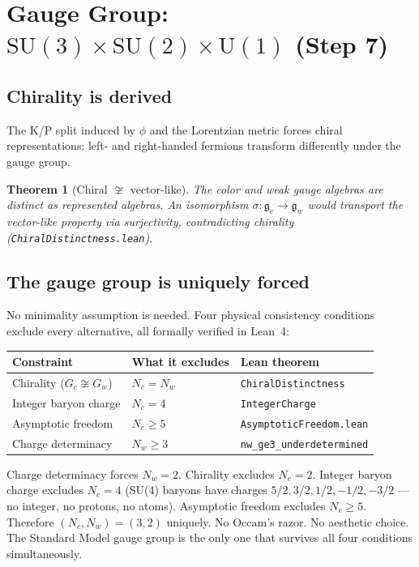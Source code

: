 \documentclass[11pt,letterpaper]{article}
\newtheorem{theorem}{Theorem}
\begin{document}
\section{Gauge Group: $\mathrm{SU}(3) \times \mathrm{SU}(2)
  \times \mathrm{U}(1)$ (Step 7)}

\subsection{Chirality is derived}

The K/P split induced by $\phi$ and the Lorentzian metric forces
chiral representations: left- and right-handed fermions transform
differently under the gauge group.

\begin{theorem}[Chiral $\not\cong$ vector-like]
\label{thm:distinct}
The color and weak gauge algebras are distinct as represented algebras.
An isomorphism $\sigma: \mathfrak{g}_c \to \mathfrak{g}_w$ would
transport the vector-like property via surjectivity, contradicting
chirality (\texttt{ChiralDistinctness.lean}).
\end{theorem}

\subsection{The gauge group is uniquely forced}
\label{sec:minimality}

No minimality assumption is needed.  Four physical consistency
conditions exclude every alternative, all formally verified in
Lean~4:

\begin{center}
\begin{tabular}{@{}lll@{}}
\toprule
Constraint & What it excludes & Lean theorem \\
\midrule
Chirality ($G_c \not\cong G_w$) & $N_c = N_w$
  & \texttt{ChiralDistinctness} \\
Integer baryon charge & $N_c = 4$
  & \texttt{IntegerCharge} \\
Asymptotic freedom & $N_c \geq 5$
  & \texttt{AsymptoticFreedom.lean} \\
Charge determinacy & $N_w \geq 3$
  & \texttt{nw\_ge3\_underdetermined} \\
\bottomrule
\end{tabular}
\end{center}

\noindent Charge determinacy forces $N_w = 2$.  Chirality excludes
$N_c = 2$.  Integer baryon charge excludes $N_c = 4$ (SU(4) baryons
have charges $5/2, 3/2, 1/2, -1/2, -3/2$ --- no integer, no protons,
no atoms).  Asymptotic freedom excludes $N_c \geq 5$.  Therefore
$(N_c, N_w) = (3, 2)$ uniquely.  No Occam's razor.  No aesthetic
choice.  The Standard Model gauge group is the only one that
survives all four conditions simultaneously.
\end{document}
